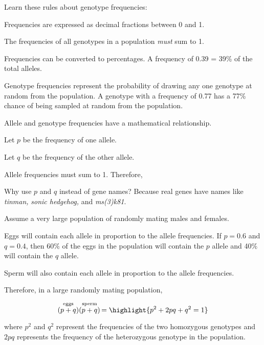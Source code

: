 \documentclass[t]{beamer}
\begin{document}
%
\begin{frame}[t]{Learn these rules about genotype frequencies:}

	\hangpara Frequencies are expressed as decimal fractions between 0 and 1.
	
	\hangpara The frequencies of all genotypes in a population \emph{must} sum to 1.
	
	\hangpara Frequencies can be converted to percentages. A frequency of 0.39 = 39\% of the total alleles.
	
	\hangpara Genotype frequencies represent the probability of drawing any one genotype at random from the population. A genotype with a frequency of 0.77 has a 77\% chance of being sampled at random from the population.

\end{frame}
%
\begin{frame}[t]{Allele and genotype frequencies have a mathematical relationship.}
	
	\hangpara Let $p$ be the frequency of one allele.
	
	\hangpara Let $q$ be the frequency of the other allele.
	
	\hangpara Allele frequencies must sum to 1. Therefore,
	
	\highlight{\[ p + q = 1.\]}
	
	\pause
	
	\vspace{\baselineskip}
	
	\hangpara {} Why use $p$ and $q$ instead of gene names?  Because real genes have names like \emph{tinman,} \emph{sonic hedgehog,} and \emph{ms(3)k81}.
\end{frame}
%
\begin{frame}[t]{Assume a very large population of randomly mating males and females.}

	\hangpara Eggs will contain each allele in proportion to the allele frequencies. If $p = 0.6$ and $q = 0.4$, then 60\% of the eggs in the population will contain the $p$ allele and 40\% will contain the $q$ allele.
	
	\hangpara Sperm will also contain each allele in proportion to the allele frequencies. 
	
	\hangpara Therefore, in a large randomly mating population, 
	
	\[ \stackrel{\text{eggs}}{(p + q)}
	\stackrel{\text{sperm}}{(p + q)}\, 
	= \highlight{p^2 + 2pq + q^2 = 1} \]
	
	\hangpara where $p^2$ and $q^2$ represent the frequencies of the two homozygous genotypes and $2pq$ represents the frequency of the heterozygous genotype in the population.
\end{frame}
\end{document}
